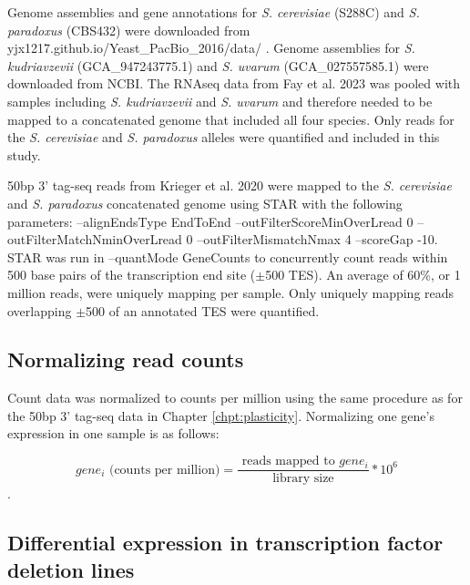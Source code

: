 Genome assemblies and gene annotations for \textit{S. cerevisiae} (S288C) and \textit{S. paradoxus} (CBS432) were downloaded from yjx1217.github.io/Yeast\_PacBio\_2016/data/ \cite{Yue2017}. Genome assemblies for \textit{S. kudriavzevii} (GCA\_947243775.1) and \textit{S. uvarum} (GCA\_027557585.1) were downloaded from NCBI. The RNAseq data from Fay et al. 2023 was pooled with samples including \textit{S. kudriavzevii} and \textit{S. uvarum} and therefore needed to be mapped to a concatenated genome that included all four species. Only reads for the \textit{S. cerevisiae} and \textit{S. paradoxus} alleles were quantified and included in this study.

50bp 3' tag-seq reads from Krieger et al. 2020 were mapped to the \textit{S. cerevisiae} and \textit{S. paradoxus} concatenated genome using STAR with the following parameters: --alignEndsType EndToEnd --outFilterScoreMinOverLread 0  --outFilterMatchNminOverLread 0 --outFilterMismatchNmax 4  --scoreGap -10. STAR was run in --quantMode GeneCounts to concurrently count reads within 500 base pairs of the transcription end site ($\pm$500 TES). An average of 60\%, or 1 million reads, were uniquely mapping per sample. Only uniquely mapping reads overlapping $\pm$500 of an annotated TES were quantified.

\subsection{Normalizing read counts}

Count data was normalized to counts per million using the same procedure as for the 50bp 3' tag-seq data in Chapter \ref{chpt:plasticity}. Normalizing one gene's expression in one sample is as follows:

$$ gene_i \text{ (counts per million)} = \frac{\text{ reads mapped to } gene_i}{\text{library size}}*10^6 $$.

\subsection{Differential expression in transcription factor deletion lines}

